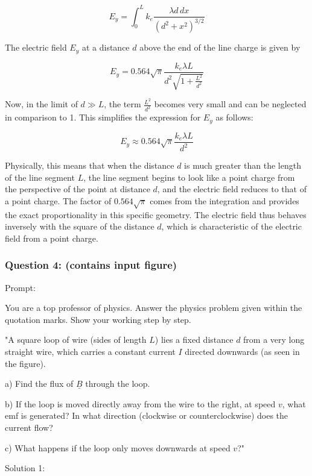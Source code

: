 \documentclass[a4paper,11pt]{article}
\begin{document}
\[ E_y = \int_0^L k_e \frac{\lambda d\,dx}{(d^2 + x^2)^{3/2}} \]

The electric field \( E_y \) at a distance \( d \) above the end of the line charge is given by

\[ E_y = 0.564 \sqrt{\pi} \frac{k_e \lambda L}{d^2 \sqrt{1 + \frac{L^2}{d^2}}} \]

Now, in the limit of \( d \gg L \), the term \( \frac{L^2}{d^2} \) becomes very small and can be neglected in comparison to 1. This simplifies the expression for \( E_y \) as follows:

\[ E_y \approx 0.564 \sqrt{\pi} \frac{k_e \lambda L}{d^2} \]

Physically, this means that when the distance \( d \) is much greater than the length of the line segment \( L \), the line segment begins to look like a point charge from the perspective of the point at distance \( d \), and the electric field reduces to that of a point charge. The factor of \( 0.564 \sqrt{\pi} \) comes from the integration and provides the exact proportionality in this specific geometry. The electric field thus behaves inversely with the square of the distance \( d \), which is characteristic of the electric field from a point charge.

\subsubsection*{Question 4: (contains input figure)}

Prompt: 
\begin{spverbatim}
    You are a top professor of physics. Answer the physics problem given within the quotation marks. Show your working step by step.

    "A square loop of wire (sides of length \( L \)) lies a fixed distance \( d \) from a very long straight wire, which carries a constant current \( I \) directed downwards (as seen in the figure).

    a) Find the flux of \( \underline{B} \) through the loop.

    b) If the loop is moved directly away from the wire to the right, at speed \( v \), what emf is generated? In what direction (clockwise or counterclockwise) does the current flow?

    c) What happens if the loop only moves downwards at speed \( v \)?"
\end{spverbatim}

\bigskip

\noindent Solution 1: \\
\end{document}
